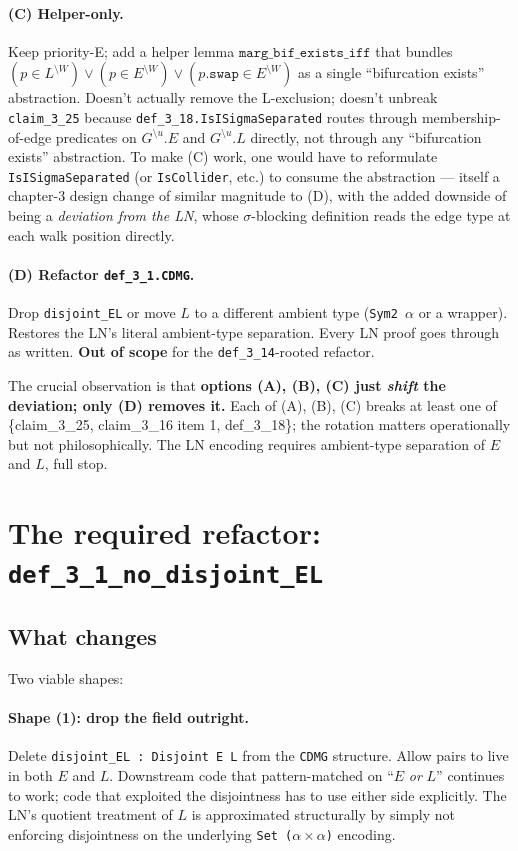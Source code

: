 \documentclass[11pt,a4paper]{article}
\providecommand{\sm}{\setminus}
\begin{document}
\paragraph{(C) Helper-only.} Keep priority-E; add a helper lemma
$\mathtt{marg\_bif\_exists\_iff}$ that bundles
$(p \in L^{\sm W}) \vee (p \in E^{\sm W}) \vee
 (p.\mathtt{swap} \in E^{\sm W})$ as a single ``bifurcation exists''
abstraction. Doesn't actually remove the L-exclusion; doesn't unbreak
\texttt{claim\_3\_25} because \texttt{def\_3\_18.IsISigmaSeparated}
routes through membership-of-edge predicates on $G^{\sm u}.E$ and
$G^{\sm u}.L$ directly, not through any ``bifurcation exists''
abstraction. To make (C) work, one would have to reformulate
\texttt{IsISigmaSeparated} (or \texttt{IsCollider}, etc.) to consume
the abstraction --- itself a chapter-3 design change of similar
magnitude to (D), with the added downside of being a \emph{deviation
from the LN}, whose $\sigma$-blocking definition reads the edge type
at each walk position directly.

\paragraph{(D) Refactor \texttt{def\_3\_1.CDMG}.} Drop \verb|disjoint_EL|
or move $L$ to a different ambient type (\texttt{Sym2 $\alpha$} or a wrapper).
Restores the LN's literal ambient-type separation. Every LN proof
goes through as written. \textbf{Out of scope} for the
\texttt{def\_3\_14}-rooted refactor.

\medskip
The crucial observation is that \textbf{options (A), (B), (C) just
\emph{shift} the deviation; only (D) removes it.} Each of (A), (B),
(C) breaks at least one of \{claim\_3\_25, claim\_3\_16 item 1,
def\_3\_18\}; the rotation matters operationally but not
philosophically. The LN encoding requires ambient-type separation
of $E$ and $L$, full stop.

\section{The required refactor: \texttt{def\_3\_1\_no\_disjoint\_EL}}

\subsection{What changes}

Two viable shapes:

\paragraph{Shape (1): drop the field outright.} Delete
\verb|disjoint_EL : Disjoint E L| from the \texttt{CDMG} structure.
Allow pairs to live in both $E$ and $L$. Downstream code that pattern-matched
on ``$E$ \emph{or} $L$'' continues to work; code that exploited the
disjointness has to use either side explicitly. The LN's quotient
treatment of $L$ is approximated structurally by simply not enforcing
disjointness on the underlying \texttt{Set ($\alpha \times \alpha$)}
encoding.
\end{document}
